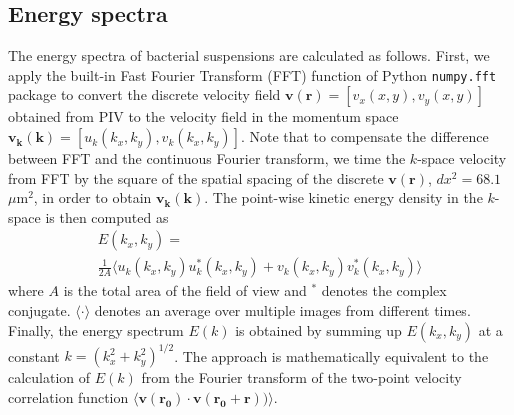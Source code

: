 \documentclass[twocolumn,aps,prx,amsmath,amssymb,longbibliography,superscriptaddress]{revtex4-2}
\begin{document}
\subsection{Energy spectra} \label{appendix-IA-ES}
The energy spectra of bacterial suspensions are calculated as follows. First, we apply the built-in Fast Fourier Transform (FFT) function of Python \texttt{numpy.fft} package to convert the discrete velocity field $\bm{v}(\bm{r}) = [v_x(x,y), v_y(x,y)]$ obtained from PIV to the velocity field in the momentum space $\bm{v_k}(\bm{k}) = [u_k(k_x,k_y),v_k(k_x,k_y)]$. Note that to compensate the difference between FFT and the continuous Fourier transform, we time the $k$-space velocity from FFT by the square of the spatial spacing of the discrete $\bm{v}(\bm{r})$, $dx^2 = 68.1$ $\mu$m$^2$, in order to obtain $\bm{v_k}(\bm{k})$. The point-wise kinetic energy density in the $k$-space is then computed as
\begin{multline}
	E(k_x, k_y) = \\
	\frac{1}{2A}\langle u_k(k_x, k_y)u^*_k(k_x, k_y)+v_k(k_x, k_y)v_k^*(k_x, k_y)\rangle
\end{multline}
where $A$ is the total area of the field of view and $^*$ denotes the complex conjugate. $\langle\cdot\rangle$ denotes an average over multiple images from different times. Finally, the energy spectrum $E(k)$ is obtained by summing up $E(k_x,k_y)$ at a constant $k=(k_x^2+k_y^2)^{1/2}$. The approach is mathematically equivalent to the calculation of $E(k)$ from the Fourier transform of the two-point velocity correlation function $\langle \bm{v}(\bm{r_0}) \cdot \bm{v}(\bm{r_0}+\bm{r})) \rangle$.
\end{document}
